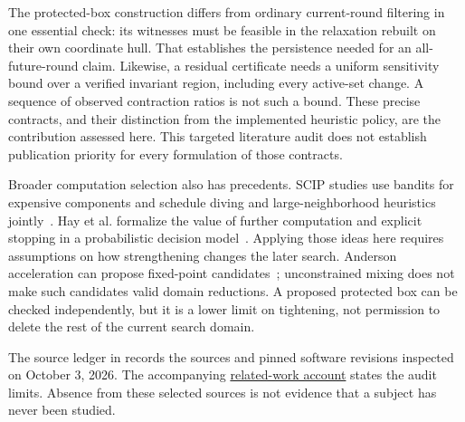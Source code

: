 The protected-box construction differs from ordinary current-round
filtering in one essential check: its witnesses must be feasible in the
relaxation rebuilt on their own coordinate hull. That establishes the
persistence needed for an all-future-round claim. Likewise, a residual
certificate needs a uniform sensitivity bound over a verified invariant
region, including every active-set change. A sequence of observed
contraction ratios is not such a bound. These precise contracts, and
their distinction from the implemented heuristic policy, are the
contribution assessed here. This targeted literature audit does not
establish publication priority for every formulation of those contracts.

Broader computation selection also has precedents. SCIP studies use
bandits for expensive components and schedule diving and large-neighborhood
heuristics jointly~\cite{hendel2018adaptive,chmiela2023scheduling}.
Hay et al. formalize the value of further computation and explicit
stopping in a probabilistic decision model~\cite{hay2012computations}.
Applying those ideas here requires assumptions on how strengthening
changes the later search. Anderson acceleration can propose fixed-point
candidates~\cite{walker2011anderson}; unconstrained mixing does not
make such candidates valid domain reductions. A proposed protected box
can be checked independently, but it is a lower limit on tightening,
not permission to delete the rest of the current search domain.

The source ledger in
records the sources and pinned software revisions inspected on
October 3, 2026. The accompanying
\href{run:../literature/related-work.md}{related-work account}
states the audit limits. Absence from these selected sources is not
evidence that a subject has never been studied.
